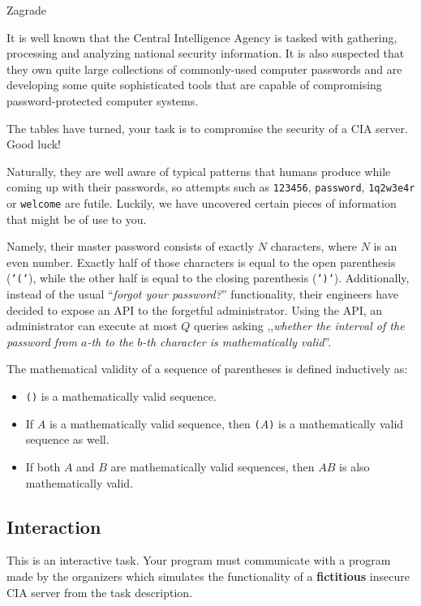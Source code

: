 \begin{statement}[
  problempoints=100,
  timelimit=3 seconds,
  memorylimit=512 MiB,
]{Zagrade}

It is well known that the Central Intelligence Agency is tasked with gathering,
processing and analyzing national security information. It is also suspected
that they own quite large collections of commonly-used computer passwords and
are developing some quite sophisticated tools that are capable of compromising
password-protected computer systems.

The tables have turned, your task is to compromise the security of a CIA
server. Good luck!

Naturally, they are well aware of typical patterns that humans produce while
coming up with their passwords, so attempts such as \texttt{123456},
\texttt{password}, \texttt{1q2w3e4r} or \texttt{welcome} are futile. Luckily,
we have uncovered certain pieces of information that might be of use to you.

Namely, their master password consists of exactly $N$ characters, where $N$
is an even number. Exactly half of those characters is equal to the open
parenthesis (\texttt{'('}), while the other half is equal to the closing
parenthesis (\texttt{')'}). Additionally, instead of the usual
``\textit{forgot your password?}'' functionality, their engineers have decided
to expose an API to the forgetful administrator. Using the API, an administrator
can execute at most $Q$ queries asking ,,\textit{whether the interval of
  the password from $a$-th to the $b$-th character is mathematically valid}''.

The mathematical validity of a sequence of parentheses is defined inductively
as:

\begin{itemize}
  \item \texttt{()} is a mathematically valid sequence.
  \item If $A$ is a mathematically valid sequence, then
    \texttt{(}$A$\texttt{)} is a mathematically valid sequence as well.
  \item If both $A$ and $B$ are mathematically valid sequences, then
        $AB$ is also mathematically valid.
\end{itemize}

\subsection*{Interaction}
This is an interactive task. Your program must communicate with a program made
by the organizers which simulates the functionality of a \textbf{fictitious}
insecure CIA server from the task description.


\end{statement}
